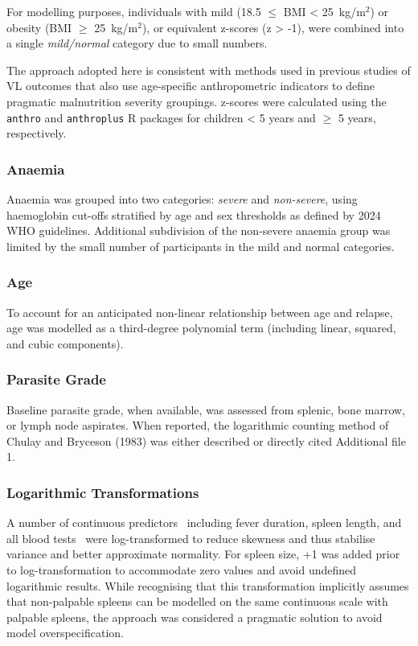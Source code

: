 For modelling purposes, individuals with mild (18.5 $\leq$ BMI < 25~kg/m$^2$) or obesity (BMI $\geq$ 25~kg/m$^2$), or equivalent z-scores (z > -1), were combined into a single \emph{mild/normal} category due to small numbers.

The approach adopted here is consistent with methods used in previous studies of VL outcomes that also use age-specific anthropometric indicators to define pragmatic malnutrition severity groupings\cite{burza2014,dorlo2017,gorski2010,naylor-leyland2022}. z-scores were calculated using the \texttt{anthro} and \texttt{anthroplus} R packages for children < 5 years and $\geq$ 5 years, respectively\cite{schumacher2023,schumacher2021}.

\subsubsection{Anaemia}

Anaemia was grouped into two categories: \emph{severe} and \emph{non-severe}, using haemoglobin cut-offs stratified by age and sex thresholds as defined by 2024 WHO guidelines\cite{who_haem2024}. Additional subdivision of the non-severe anaemia group was limited by the small number of participants in the mild and normal categories.

\subsubsection{Age}

To account for an anticipated non-linear relationship between age and relapse, age was modelled as a third-degree polynomial term (including linear, squared, and cubic components).

\subsubsection{Parasite Grade}

Baseline parasite grade, when available, was assessed from splenic, bone marrow, or lymph node aspirates. When reported, the logarithmic counting method of Chulay and Bryceson (1983) was either described or directly cited {Additional file 1}\cite{chulay1983}.

\subsubsection{Logarithmic Transformations}

A number of continuous predictors \textemdash\ including fever duration, spleen length, and all blood tests \textemdash\ were log-transformed to reduce skewness and thus stabilise variance and better approximate normality. For spleen size, +1 was added prior to log-transformation to accommodate zero values and avoid undefined logarithmic results. While recognising that this transformation implicitly assumes that non-palpable spleens can be modelled on the same continuous scale with palpable spleens, the approach was considered a pragmatic solution to avoid model overspecification.

